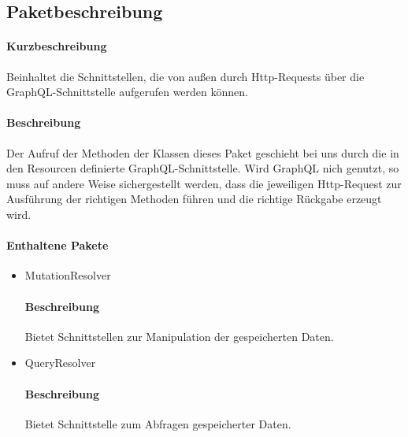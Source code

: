 \subsection*{Paketbeschreibung}%
\paragraph*{Kurzbeschreibung}
Beinhaltet die Schnittstellen, die von außen durch Http-Requests über die GraphQL-Schnittstelle aufgerufen werden können.
\paragraph*{Beschreibung}
Der Aufruf der Methoden der Klassen dieses Paket geschieht bei uns durch die in den Resourcen definierte GraphQL-Schnittstelle.
Wird GraphQL nich genutzt, so muss auf andere Weise sichergestellt werden, dass die jeweiligen Http-Request zur Ausführung der richtigen Methoden
führen und die richtige Rückgabe erzeugt wird.
\paragraph*{Enthaltene Pakete}
\begin{itemize}
    \item MutationResolver
    		\paragraph*{Beschreibung}
        Bietet Schnittstellen zur Manipulation der gespeicherten Daten.
    \item QueryResolver
    		\paragraph*{Beschreibung}
    		Bietet Schnittstelle zum Abfragen gespeicherter Daten.
\end{itemize}

